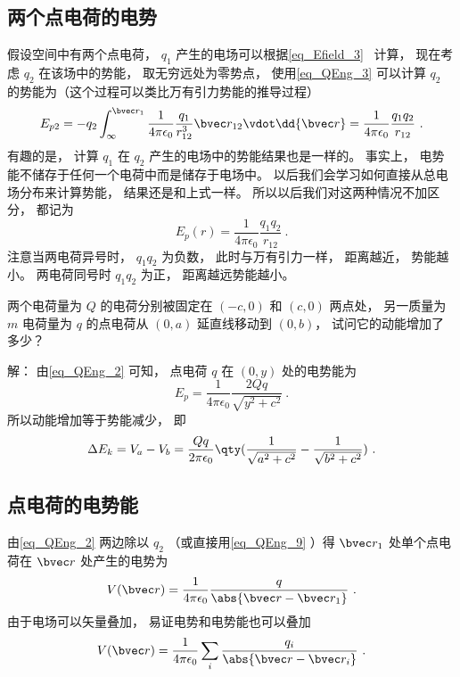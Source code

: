 \subsection{两个点电荷的电势}
假设空间中有两个点电荷， $q_1$ 产生的电场可以根据\autoref{eq_Efield_3}~ 计算， 现在考虑 $q_2$ 在该场中的势能， 取无穷远处为零势点， 使用\autoref{eq_QEng_3} 可以计算 $q_2$ 的势能为（这个过程可以类比万有引力势能的推导过程）
\begin{equation}
E_{p2} = -q_2 \int_{\infty}^{\bvec r_1} \frac{1}{4\pi\epsilon_0} \frac{q_1}{r_{12}^3}\bvec r_{12} \vdot \dd{\bvec r}
= \frac{1}{4\pi\epsilon_0} \frac{q_1 q_2}{r_{12}}~.
\end{equation}
有趣的是， 计算 $q_1$ 在 $q_2$ 产生的电场中的势能结果也是一样的。 事实上， 电势能不储存于任何一个电荷中而是储存于电场中。 以后我们会学习如何直接从总电场分布来计算势能， 结果还是和上式一样。 %
所以以后我们对这两种情况不加区分， 都记为
\begin{equation}\label{eq_QEng_2}
E_p(r) = \frac{1}{4\pi\epsilon_0} \frac{q_1 q_2}{r_{12}}~.
\end{equation}
注意当两电荷异号时， $q_1 q_2$ 为负数， 此时与万有引力一样， 距离越近， 势能越小。 两电荷同号时 $q_1 q_2$ 为正， 距离越远势能越小。

\begin{example}{}
两个电荷量为 $Q$ 的电荷分别被固定在 $(-c, 0)$ 和 $(c, 0)$ 两点处， 另一质量为 $m$ 电荷量为 $q$ 的点电荷从 $(0, a)$ 延直线移动到 $(0, b)$， 试问它的动能增加了多少？

解： 由\autoref{eq_QEng_2} 可知， 点电荷 $q$ 在 $(0, y)$ 处的电势能为
\begin{equation}
E_p = \frac{1}{4\pi\epsilon_0}\frac{2Qq}{\sqrt{y^2 + c^2}}~.
\end{equation}
所以动能增加等于势能减少， 即
\begin{equation}
\Delta E_k = V_a - V_b = \frac{Qq}{2\pi\epsilon_0}  \qty(\frac{1}{\sqrt{a^2 + c^2}} - \frac{1}{\sqrt{b^2 + c^2}})~.
\end{equation}
\end{example}

\subsection{点电荷的电势能}
由\autoref{eq_QEng_2} 两边除以 $q_2$ （或直接用\autoref{eq_QEng_9} ）得 $\bvec r_1$ 处单个点电荷在 $\bvec r$ 处产生的电势为
\begin{equation}
V(\bvec r) = \frac{1}{4\pi\epsilon_0} \frac{q}{\abs{\bvec r - \bvec r_1}}~.
\end{equation}
由于电场可以矢量叠加， 易证电势和电势能也可以叠加
\begin{equation}
V(\bvec r) = \frac{1}{4\pi\epsilon_0} \sum_i \frac{q_i}{\abs{\bvec r - \bvec r_i}}~.
\end{equation}

